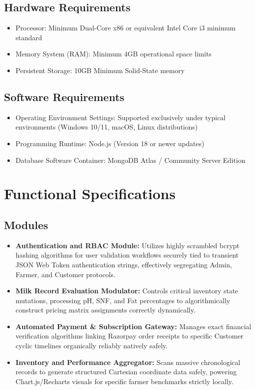 \documentclass[12pt,a4paper]{report}
\begin{document}
\subsection{Hardware Requirements}
\begin{itemize}
    \item Processor: Minimum Dual-Core x86 or equivalent Intel Core i3 minimum standard
    \item Memory System (RAM): Minimum 4GB operational space limits
    \item Persistent Storage: 10GB Minimum Solid-State memory
\end{itemize}
\subsection{Software Requirements}
\begin{itemize}
    \item Operating Environment Settings: Supported exclusively under typical environments (Windows 10/11, macOS, Linux distributions)
    \item Programming Runtime: Node.js (Version 18 or newer updates)
    \item Database Software Container: MongoDB Atlas / Community Server Edition
\end{itemize}

\section{Functional Specifications}
\subsection{Modules}
\begin{itemize}
    \item \textbf{Authentication and RBAC Module:} Utilizes highly scrambled bcrypt hashing algorithms for user validation workflows securely tied to transient JSON Web Token authentication strings, effectively segregating Admin, Farmer, and Customer protocols.
    \item \textbf{Milk Record Evaluation Modulator:} Controls critical inventory state mutations, processing pH, SNF, and Fat percentages to algorithmically construct pricing matrix assignments correctly dynamically.
    \item \textbf{Automated Payment \& Subscription Gateway:} Manages exact financial verification algorithms linking Razorpay order receipts to specific Customer cyclic timelines organically reliably natively safely.
    \item \textbf{Inventory and Performance Aggregator:} Scans massive chronological records to generate structured Cartesian coordinate data safely, powering Chart.js/Recharts visuals for specific farmer benchmarks strictly locally.
\end{itemize}
\end{document}
